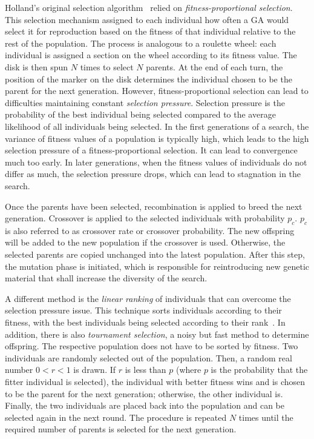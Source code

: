 \documentclass[paper=a4,%
  twoside,%
  BCOR4mm,%
  abstract=true,%
  toc=bibliography,%
  chapterprefix=true,%
  toc=bibliographynumbered,%
  open=right,%
  english,%
  pagesize=pdftex]{scrreprt}
\begin{document}
Holland's original selection algorithm~\cite{Holland1992} relied on \emph{fitness-proportional selection}. This selection mechanism assigned to each individual how often a \ac{GA} would select it for reproduction based on the fitness of that individual relative to the rest of the population. The process is analogous to a roulette wheel: each individual is assigned a section on the wheel according to its fitness value. The disk is then spun $N$ times to select $N$ parents. At the end of each turn, the position of the marker on the disk determines the individual chosen to be the parent for the next generation. However, fitness-proportional selection can lead to difficulties maintaining constant \emph{selection pressure}. Selection pressure is the probability of the best individual being selected compared to the average likelihood of all individuals being selected. In the first generations of a search, the variance of fitness values of a population is typically high, which leads to the high selection pressure of a fitness-proportional selection. It can lead to convergence much too early. In later generations, when the fitness values of individuals do not differ as much, the selection pressure drops, which can lead to stagnation in the search.

Once the parents have been selected, recombination is applied to breed the next generation. Crossover is applied to the selected individuals with probability $p_c$. $p_c$ is also referred to as crossover rate or crossover probability. The new offspring will be added to the new population if the crossover is used. Otherwise, the selected parents are copied unchanged into the latest population. After this step, the mutation phase is initiated, which is responsible for reintroducing new genetic material that shall increase the diversity of the search.

A different method is the \emph{linear ranking} of individuals that can overcome the selection pressure issue. This technique sorts individuals according to their fitness, with the best individuals being selected according to their rank~\cite{whitley1989genitor}. In addition, there is also \emph{tournament selection}, a noisy but fast method to determine offspring. The respective population does not have to be sorted by fitness. Two individuals are randomly selected out of the population. Then, a random real number $0 < r < 1$ is drawn. If $r$ is less than $p$ (where $p$ is the probability that the fitter individual is selected), the individual with better fitness wins and is chosen to be the parent for the next generation; otherwise, the other individual is. Finally, the two individuals are placed back into the population and can be selected again in the next round. The procedure is repeated $N$ times until the required number of parents is selected for the next generation.
\end{document}
